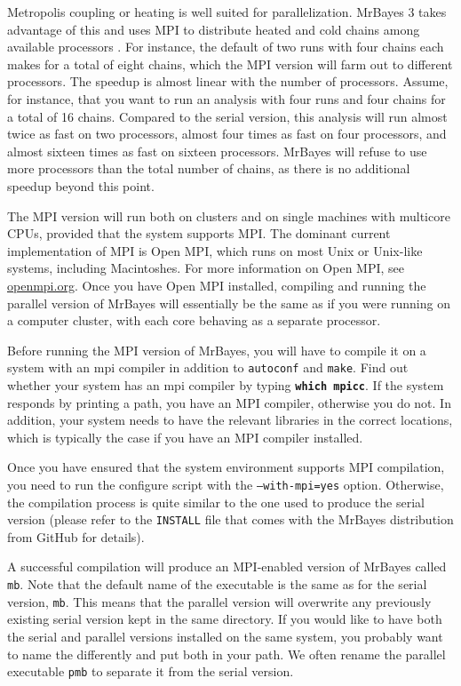 \documentclass[12pt]{book}
\newcommand{\ttt}[1]{\texttt{#1}}
\newcommand{\tb}[1]{\ttt{\textbf{#1}}}
\begin{document}
Metropolis coupling or heating is well suited for parallelization. MrBayes 3 takes advantage of
this and uses MPI to distribute heated and cold chains among available processors
\citep{altekar04}. For instance, the default of two runs with four chains each makes for a total of
eight chains, which the MPI version will farm out to different processors. The speedup is almost
linear with the number of processors. Assume, for instance, that you want to run an analysis with
four runs and four chains for a total of 16 chains. Compared to the serial version, this analysis
will run almost twice as fast on two processors, almost four times as fast on four processors, and
almost sixteen times as fast on sixteen processors. MrBayes will refuse to use more processors than
the total number of chains, as there is no additional speedup beyond this point.

The MPI version will run both on clusters and on single machines with multicore CPUs, provided that
the system supports MPI. The dominant current implementation of MPI is Open MPI, which runs on most
Unix or Unix-like systems, including Macintoshes. For more information on Open MPI, see
\url{openmpi.org}. Once you have Open MPI installed, compiling and running the parallel version of
MrBayes will essentially be the same as if you were running on a computer cluster, with each core
behaving as a separate processor.

Before running the MPI version of MrBayes, you will have to compile it on a system with an mpi
compiler in addition to \texttt{autoconf} and \texttt{make}. Find out whether your system has an mpi
compiler by typing \tb{which mpicc}. If the system responds by printing a path, you have an MPI
compiler, otherwise you do not. In addition, your system needs to have the relevant libraries in
the correct locations, which is typically the case if you have an MPI compiler installed.

Once you have ensured that the system environment supports MPI compilation, you need to run the
configure script with the \texttt{--with-mpi=yes} option. Otherwise, the compilation process is
quite similar to the one used to produce the serial version (please refer to the \texttt{INSTALL}
file that comes with the MrBayes distribution from GitHub for details).

A successful compilation will produce an MPI-enabled version of MrBayes called \texttt{mb}. Note
that the default name of the executable is the same as for the serial version, \texttt{mb}. This
means that the parallel version will overwrite any previously existing serial version kept in the
same directory. If you would like to have both the serial and parallel versions installed on the
same system, you probably want to name the differently and put both in your path. We often rename
the parallel executable \texttt{pmb} to separate it from the serial version.
\end{document}
